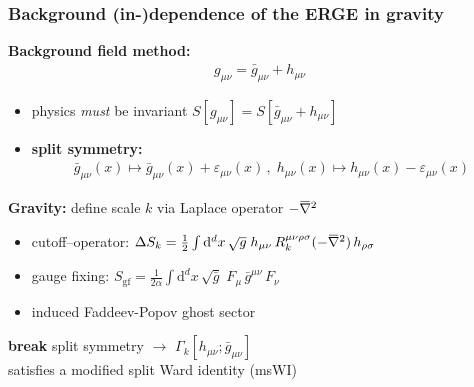 \documentclass[]{beamer}  %
\newcommand{\overbar}[1]{\mkern 1.5mu\overline{\mkern-1.5mu#1\mkern-1.5mu}\mkern 1.5mu}
\newcommand{\bnabla}{\overbar \nabla}
\begin{document}
\begin{frame}
  \frametitle{Background (in-)dependence of the ERGE in gravity}
  \textbf{Background field method:}
  \begin{align*}
    \boxed{
      g_{\mu\nu} = \bar{g}_{\mu\nu} + h_{\mu\nu}
    }
  \end{align*}
  \begin{itemize}
    \item physics \textit{must} be invariant $S[g_{\mu\nu}] = S[\bar{g}_{\mu\nu} + h_{\mu\nu}]$
    \item \textbf{split symmetry:}
      \begin{align*}
        \boxed{
          \bar g_{\mu\nu}(x) \mapsto \bar g_{\mu\nu}(x) + \varepsilon_{\mu\nu}(x) \,, \;
          h_{\mu\nu}(x) \mapsto h_{\mu\nu}(x) - \varepsilon_{\mu\nu}(x)
        }
      \end{align*}
  \end{itemize}
  \pause
  \textbf{Gravity:} define scale $k$ via Laplace operator $-\bnabla^2$\\[5pt]
  \vspace{5pt}
  \begin{itemize}
    \item cutoff--operator:
      $\Delta S_k = \frac 12 \int \mathrm d^d x \, \sqrt{g} \;
      h_{\mu\nu} \, R_k^{\mu\nu\rho\sigma}(-\bnabla^2) \, h_{\rho\sigma} $\\[3pt]
    \item gauge fixing:
      $S_{\mathrm{gf}} = \frac{1}{2\alpha} \int \mathrm d^dx \, \sqrt{\bar g} \;
      F_\mu \, \bar g^{\mu\nu} \, F_\nu$\\[5pt]
    \item induced Faddeev-Popov ghost sector
  \end{itemize}
  \vspace{10pt}
  \textbf{break} split symmetry $\rightarrow$ $\Gamma_k[h_{\mu\nu}; \bar g_{\mu\nu}]$\\
  satisfies a modified split Ward identity (msWI)
\end{frame}


\end{document}
